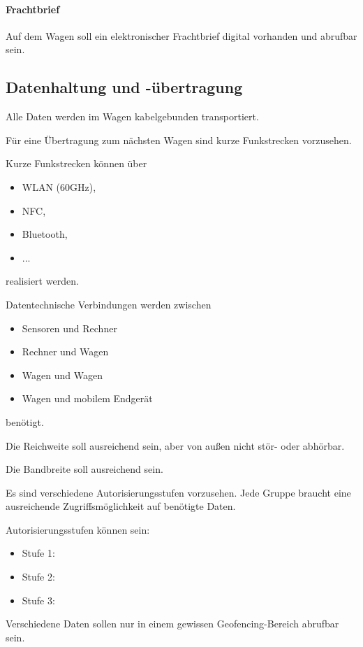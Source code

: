 \paragraph{Frachtbrief}
\begin{feat}
Auf dem Wagen soll ein elektronischer Frachtbrief digital vorhanden und abrufbar sein.
\end{feat}

\subsection{Datenhaltung und -übertragung}
\begin{feat}
Alle Daten werden im Wagen kabelgebunden transportiert. 
\end{feat}
\begin{feat}
Für eine Übertragung zum nächsten Wagen sind kurze Funkstrecken vorzusehen.
\end{feat}
\begin{rem}[zu Anf. 35]
Kurze Funkstrecken können über
\begin{itemize}
    \item WLAN (60GHz),
    \item NFC,
    \item Bluetooth,
    \item ...
\end{itemize}
realisiert werden.
\end{rem}
\begin{feat}
Datentechnische Verbindungen werden zwischen 
\begin{itemize}
    \item Sensoren und Rechner
    \item Rechner und Wagen
    \item Wagen und Wagen
    \item Wagen und mobilem Endgerät
\end{itemize}
benötigt.
\end{feat}
\begin{feat}
Die Reichweite soll ausreichend sein, aber von außen nicht stör- oder abhörbar.
\end{feat}
\begin{feat}
Die Bandbreite soll ausreichend sein.
\end{feat}
\begin{feat}
Es sind verschiedene Autorisierungsstufen vorzusehen. Jede Gruppe braucht eine ausreichende Zugriffsmöglichkeit auf benötigte Daten.
\end{feat}
\begin{rem} [zu Anf. 39]
Autorisierungsstufen können sein:
\begin{itemize}
    \item Stufe 1:
    \item Stufe 2:
    \item Stufe 3:
\end{itemize}
\end{rem}
\begin{rem} [zu Anf. 39]
Verschiedene Daten sollen nur in einem gewissen Geofencing-Bereich abrufbar sein.
\end{rem}


